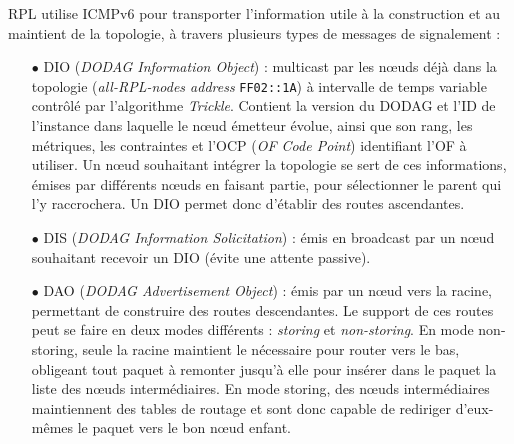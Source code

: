 \documentclass[]{report}
\begin{document}
\par RPL utilise ICMPv6 pour transporter l'information utile à la construction et au maintient de la topologie, à travers plusieurs types de messages de signalement : 
\vspace{0.2cm}
\begin{itemize}
\item[$\bullet$] DIO (\textit{DODAG Information Object}) : multicast par les nœuds déjà dans la topologie (\textit{all-RPL-nodes address} \texttt{FF02::1A}) à intervalle de temps variable contrôlé par l'algorithme \textit{Trickle}. Contient la version du DODAG et l'ID de l'instance dans laquelle le nœud émetteur évolue, ainsi que son rang, les métriques, les contraintes et l'OCP (\textit{OF Code Point}) identifiant l'OF à utiliser. Un nœud souhaitant intégrer la topologie se sert de ces informations, émises par différents nœuds en faisant partie, pour sélectionner le parent qui l'y raccrochera. Un DIO permet donc d'établir des routes ascendantes.
\vspace{0.2cm}
\item[$\bullet$] DIS (\textit{DODAG Information Solicitation}) : émis en broadcast par un nœud souhaitant recevoir un DIO (évite une attente passive).
\vspace{0.2cm}
\item[$\bullet$] DAO (\textit{DODAG Advertisement Object}) : émis par un nœud vers la racine, permettant de construire des routes descendantes. Le support de ces routes peut se faire en deux modes différents : \textit{storing} et \textit{non-storing}. En mode non-storing, seule la racine maintient le nécessaire pour router vers le bas, obligeant tout paquet à remonter jusqu'à elle pour insérer dans le paquet la liste des nœuds intermédiaires. En mode storing, des nœuds intermédiaires maintiennent des tables de routage et sont donc capable de rediriger d'eux-mêmes le paquet vers le bon nœud enfant. 
\end{itemize}
 
\vspace{0.5cm}
\end{document}
